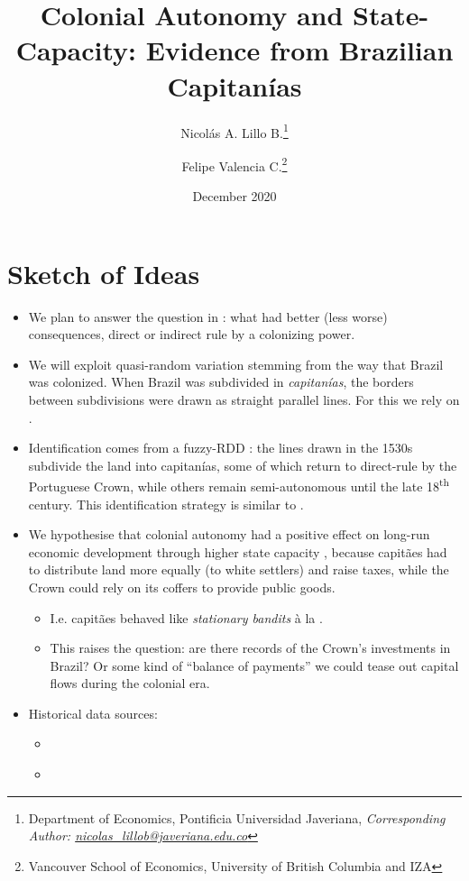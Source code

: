 \documentclass[11pt,a4paper]{article}
\title{Colonial Autonomy and State-Capacity: Evidence from Brazilian Capitan\'ias}
\date{December 2020}
\author{Nicol\'as A. Lillo B.\thanks{Department of Economics, Pontificia Universidad Javeriana, \emph{Corresponding Author: \href{mailto:nicolas_lillob@javeriana.edu.co}{nicolas\_lillob@javeriana.edu.co}}} \and Felipe Valencia C.\thanks{Vancouver School of Economics, University of British Columbia and IZA}}
\begin{document}
	\maketitle
	
	\section{Sketch of Ideas}
	\begin{itemize}
		\item We plan to answer the question in \textcite{Iyer2010}: what had better (less worse) consequences, direct or indirect rule by a colonizing power.
		\item We will exploit quasi-random variation stemming from the way that Brazil was colonized. When Brazil was subdivided in \emph{capitan\'ias}, the borders between subdivisions were drawn as straight parallel lines. For this we rely on \textcite{Cintra2013}.
		\item Identification comes from a fuzzy-RDD \parencite{Cattaneo2019,Cattaneo2019a}: the lines drawn in the 1530s subdivide the land into capitan\'ias, some of which return to direct-rule by the Portuguese Crown, while others remain semi-autonomous until the late 18\textsuperscript{th} century. This identification strategy is similar to \textcite{Michalopoulos2014}.
		\item We hypothesise that colonial autonomy had a positive effect on long-run economic development through higher state capacity \parencite{Besley2009}, because capit\~aes had to distribute land more equally (to white settlers) and raise taxes, while the Crown could rely on its coffers to provide public goods. 
		\begin{itemize}
			\item I.e. capit\~aes behaved like \emph{stationary bandits} \`{a} la \textcite{Olson1993}.
			\item This raises the question: are there records of the Crown's investments in Brazil? Or some kind of ``balance of payments'' we could tease out capital flows during the colonial era.
		\end{itemize}
		\item Historical data sources:
		\begin{itemize}
			\item \textcite{Naritomi2007,Naritomi2012}
			\item \textcite{Fujiwara2017}
		\end{itemize}
	\end{itemize}
\end{document}
